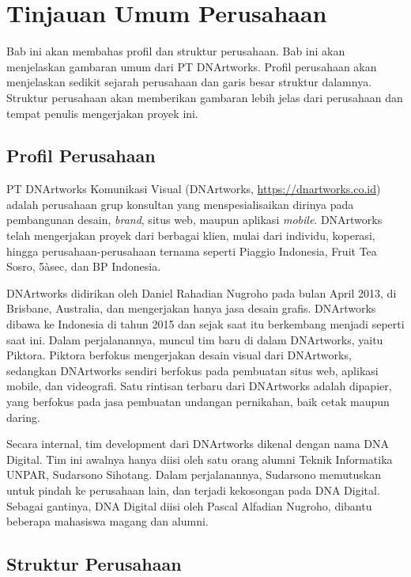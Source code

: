 \chapter{Tinjauan Umum Perusahaan}
\label{chap:tinjauanperusahaan}
Bab ini akan membahas profil dan struktur perusahaan. Bab ini akan menjelaskan gambaran umum dari PT DNArtworks. Profil perusahaan akan menjelaskan sedikit sejarah perusahaan dan garis besar struktur dalamnya. Struktur perusahaan akan memberikan gambaran lebih jelas dari perusahaan dan tempat penulis mengerjakan proyek ini.

\section{Profil Perusahaan}
\label{sec:profilperusahaan} 
 PT DNArtworks Komunikasi Visual (DNArtworks, \href{https://dnartworks.co.id}{https://dnartworks.co.id}) adalah perusahaan grup konsultan yang menspesialisaikan dirinya pada pembangunan desain, \textit{brand}, situs web, maupun aplikasi \textit{mobile}. DNArtworks telah mengerjakan proyek dari berbagai klien, mulai dari individu, koperasi, hingga perusahaan-perusahaan ternama seperti Piaggio Indonesia, Fruit Tea Sosro, 5àsec, dan BP Indonesia.
 
 DNArtworks didirikan oleh Daniel Rahadian Nugroho pada bulan April 2013, di Brisbane, Australia, dan mengerjakan hanya jasa desain grafis. DNArtworks dibawa ke Indonesia di tahun 2015 dan sejak saat itu berkembang menjadi seperti saat ini. Dalam perjalanannya, muncul tim baru di dalam DNArtworks, yaitu Piktora. Piktora berfokus mengerjakan desain visual dari DNArtworks, sedangkan DNArtworks sendiri berfokus pada pembuatan situs web, aplikasi mobile, dan videografi. Satu rintisan terbaru dari DNArtworks adalah dipapier, yang berfokus pada jasa pembuatan undangan pernikahan, baik cetak maupun daring.

Secara internal, tim development dari DNArtworks dikenal dengan nama DNA Digital. Tim ini awalnya hanya diisi oleh satu orang alumni Teknik Informatika UNPAR, Sudarsono Sihotang. Dalam perjalanannya, Sudarsono memutuskan untuk pindah ke perusahaan lain, dan terjadi kekosongan pada DNA Digital. Sebagai gantinya, DNA Digital diisi oleh Pascal Alfadian Nugroho, dibantu beberapa mahasiswa magang dan alumni.

\section{Struktur Perusahaan}
\label{sec:strukturperusahaan}

